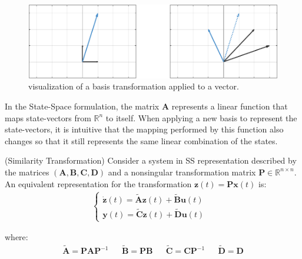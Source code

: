 \documentclass[a4paper,11pt]{book}
\numberwithin{figure}{chapter}
\numberwithin{equation}{chapter}
\numberwithin{table}{chapter}
\newtheorem{theorem}{Theorem}[chapter]
\theoremstyle{definition}
\newcounter{boxed-theorem}
\newenvironment{boxed-theorem}[1]
{\begin{shaded} \begin{theorem}{#1}}
{\end{theorem} \end{shaded}}
\newcounter{boxed-definition}
\begin{document}
\begin{figure}[ht]
    \centering
    \includegraphics[width=\textwidth]{chapter2/similarity01}
    \caption{visualization of a basis transformation applied to a vector.}
    \label{fig:similarity01}
\end{figure}

In the State-Space formulation, the matrix $\bm{A}$ represents a linear function that maps state-vectors from $\mathbb{R}^{n}$ to itself. When applying a new basis to represent the state-vectors, it is intuitive that the mapping performed by this function also changes so that it still represents the same linear combination of the states.

\begin{boxed-theorem}{(Similarity Transformation)}
	Consider a system in SS representation described by the matrices $(\bm{A}, \bm{B}, \bm{C}, \bm{D})$ and a nonsingular transformation matrix $\bm{P} \in \mathbb{R}^{n \times n}$. An equivalent representation for the transformation $\bm{z}(t) = \bm{P} \bm{x}(t)$ is:
	\begin{align}
	\begin{cases}
		\dot{\bm{z}}(t) = \tilde{\bm{A}} \bm{z}(t) + \tilde{\bm{B}} \bm{u}(t) & \\
		\bm{y}(t) = \tilde{\bm{C}} \bm{z}(t) + \tilde{\bm{D}} \bm{u}(t)
	\end{cases}	
	\end{align}
	
	\noindent where:
	\begin{equation}
		\begin{matrix}
			\tilde{\bm{A}} = \bm{P} \bm{A} \bm{P}^{-1} & & \tilde{\bm{B}} = \bm{P} \bm{B} & & \tilde{\bm{C}} = \bm{C} \bm{P}^{-1} & & \tilde{\bm{D}} = \bm{D}
		\end{matrix}
	\end{equation}
\end{boxed-theorem}
\end{document}
